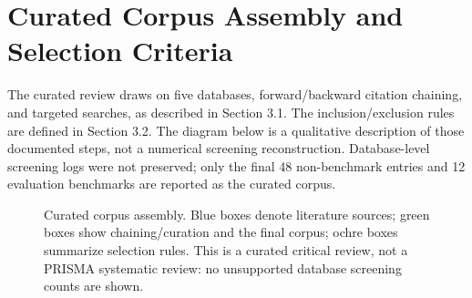 \documentclass[preprint,12pt]{elsarticle}
\begin{document}
\clearpage
\section{Curated Corpus Assembly and Selection Criteria}
\label{app:curated_flow}
The curated review draws on five databases, forward/backward citation chaining,
and targeted searches, as described in Section 3.1. The inclusion/exclusion rules
are defined in Section 3.2. The diagram below is a qualitative description of
those documented steps, not a numerical screening reconstruction. Database-level
screening logs were not preserved; only the final 48 non-benchmark entries and
12 evaluation benchmarks are reported as the curated corpus.

\begingroup
\setcounter{figure}{0}
\renewcommand{\thefigure}{\thesection.\arabic{figure}}
\begin{figure}[!htbp]
\centering
\resizebox{\textwidth}{!}{}
\caption{Curated corpus assembly. Blue boxes denote literature sources; green boxes show
chaining/curation and the final corpus; ochre boxes summarize selection rules.
This is a curated critical review, not a PRISMA systematic review: no
unsupported database screening counts are shown.}
\label{fig:v5_corpus_flow}
\end{figure}
\endgroup
\end{document}
